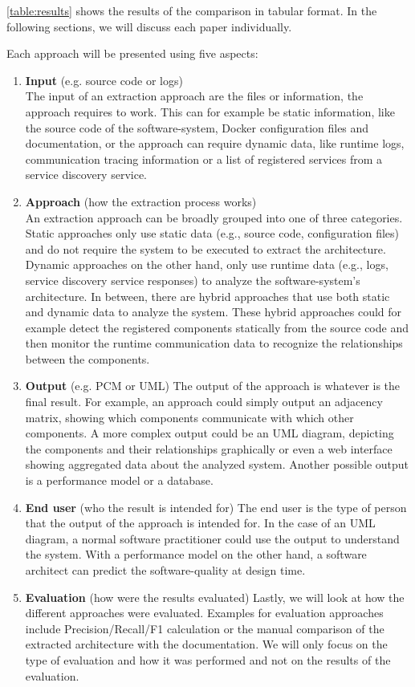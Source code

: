 \autoref{table:results} shows the results of the comparison in tabular format.
In the following sections, we will discuss each paper individually.

Each approach will be presented using five aspects:
\begin{enumerate}
	\item \textbf{Input} (e.g. source code or logs) \\
		  The input of an extraction approach are the files or information, the approach requires to work.
		  This can for example be static information, like the source code of the software-system, Docker configuration files and documentation, or the approach can require dynamic data, like runtime logs, communication tracing information or a list of registered services from a service discovery service.
	\item \textbf{Approach} (how the extraction process works) \\
	      An extraction approach can be broadly grouped into one of three categories.
	      Static approaches only use static data (e.g., source code, configuration files) and do not require the system to be executed to extract the architecture.
	      Dynamic approaches on the other hand, only use runtime data (e.g., logs, service discovery service responses) to analyze the software-system's architecture.
	      In between, there are hybrid approaches that use both static and dynamic data to analyze the system. These hybrid approaches could for example detect the registered components statically from the source code and then monitor the runtime communication data to recognize the relationships between the components.
	\item \textbf{Output} (e.g. PCM or UML)
	      The output of the approach is whatever is the final result.
	      For example, an approach could simply output an adjacency matrix, showing which components communicate with which other components.
	      A more complex output could be an UML diagram, depicting the components and their relationships graphically or even a web interface showing aggregated data about the analyzed system.
	      Another possible output is a performance model or a database.
	\item \textbf{End user} (who the result is intended for)
		  The end user is the type of person that the output of the approach is intended for.
		  In the case of an UML diagram, a normal software practitioner could use the output to understand the system.
  		  With a performance model on the other hand, a software architect can predict the software-quality at design time.
	\item \textbf{Evaluation} (how were the results evaluated)
		  Lastly, we will look at how the different approaches were evaluated.
		  Examples for evaluation approaches include Precision/Recall/F1 calculation or the manual comparison of the extracted architecture with the documentation.
		  We will only focus on the type of evaluation and how it was performed and not on the results of the evaluation.
\end{enumerate}


